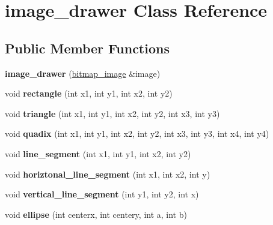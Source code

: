\hypertarget{classimage__drawer}{}\section{image\+\_\+drawer Class Reference}
\label{classimage__drawer}
\subsection*{Public Member Functions}
\begin{DoxyCompactItemize}
\item 
\mbox{\label{classimage__drawer_ad0a4d93c1751099ece20e903dcefc4db}} 
{\bfseries image\+\_\+drawer} (\mbox{\hyperlink{classbitmap__image}{bitmap\+\_\+image}} \&image)
\item 
\mbox{\label{classimage__drawer_a724e010001cdefcfb8476cce0cf55b83}} 
void {\bfseries rectangle} (int x1, int y1, int x2, int y2)
\item 
\mbox{\label{classimage__drawer_aa491775ef7254b7ec606c01bd6918c4a}} 
void {\bfseries triangle} (int x1, int y1, int x2, int y2, int x3, int y3)
\item 
\mbox{\label{classimage__drawer_a528652f2530baa5a92a36f27aa1f07cc}} 
void {\bfseries quadix} (int x1, int y1, int x2, int y2, int x3, int y3, int x4, int y4)
\item 
\mbox{\label{classimage__drawer_ab1d5033f9576ec5ffc707e7b8c1a353e}} 
void {\bfseries line\+\_\+segment} (int x1, int y1, int x2, int y2)
\item 
\mbox{\label{classimage__drawer_a29b91388e3b931b8626565b18f6cbe4f}} 
void {\bfseries horiztonal\+\_\+line\+\_\+segment} (int x1, int x2, int y)
\item 
\mbox{\label{classimage__drawer_a9956e3efeb63ac8721109ea6417b0d1a}} 
void {\bfseries vertical\+\_\+line\+\_\+segment} (int y1, int y2, int x)
\item 
\mbox{\label{classimage__drawer_aaf48a7e0d70663c3a59a223440e18023}} 
void {\bfseries ellipse} (int centerx, int centery, int a, int b)

\end{DoxyCompactItemize}
